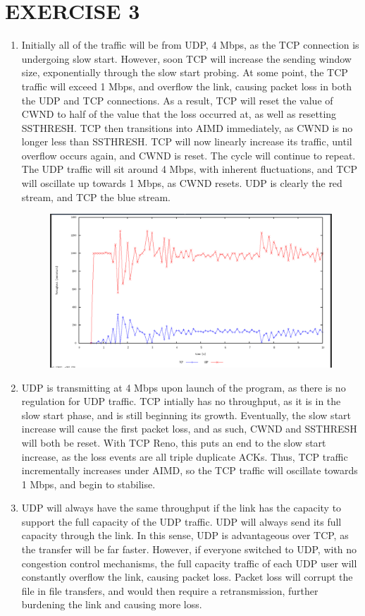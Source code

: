 \documentclass[a4paper,11pt]{article}
\begin{document}
\section{EXERCISE 3}
\begin{enumerate}[leftmargin=*]
	\item Initially all of the traffic will be from UDP, 4 Mbps, as the TCP connection is undergoing slow start. However, soon TCP will increase the sending window size, exponentially through the slow start probing. At some point, the TCP traffic will exceed 1 Mbps, and overflow the link, causing packet loss in both the UDP and TCP connections. As a result, TCP will reset the value of CWND to half of the value that the loss occurred at, as well as resetting SSTHRESH. TCP then transitions into AIMD immediately, as CWND is no longer less than SSTHRESH. TCP will now linearly increase its traffic, until overflow occurs again, and CWND is reset. The cycle will continue to repeat. The UDP traffic will sit around 4 Mbps, with inherent fluctuations, and TCP will oscillate up towards 1 Mbps, as CWND resets. UDP is clearly the red stream, and TCP the blue stream.
	\begin{figure}[!htb]
		\centering
		\includegraphics[width=\linewidth, height=0.43\textheight]{tu1f.png}
	\end{figure}
	
	\item UDP is transmitting at 4 Mbps upon launch of the program, as there is no regulation for UDP traffic. TCP intially has no throughput, as it is in the slow start phase, and is still beginning its growth. Eventually, the slow start increase will cause the first packet loss, and as such, CWND and SSTHRESH will both be reset. With TCP Reno, this puts an end to the slow start increase, as the loss events are all triple duplicate ACKs. Thus, TCP traffic incrementally increases under AIMD, so the TCP traffic will oscillate towards 1 Mbps, and begin to stabilise.
	\item UDP will always have the same throughput if the link has the capacity to support the full capacity of the UDP traffic. UDP will always send its full capacity through the link. In this sense, UDP is advantageous over TCP, as the transfer will be far faster. However, if everyone switched to UDP, with no congestion control mechanisms, the full capacity traffic of each UDP user will constantly overflow the link, causing packet loss. Packet loss will corrupt the file in file transfers, and would then require a retransmission, further burdening the link and causing more loss.
\end{enumerate}
\end{document}

